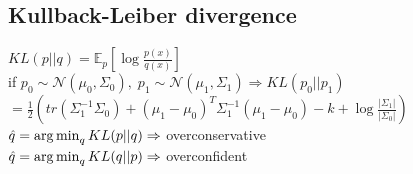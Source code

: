 \subsection{Kullback-Leiber divergence}
$KL(p\vert\vert q)=\mathbb{E}_p\left[\log\frac{p(x)}{q(x)}\right]$\\
if $p_0\sim \mathcal{N}(\mu_0,\Sigma_0),\; p_1\sim \mathcal{N}(\mu_1,\Sigma_1) \Rightarrow KL(p_0\vert\vert p_1)$\\
{\scriptsize$ = \frac{1}{2}\left(tr\left(\Sigma_1^{-1}\Sigma_0\right) + (\mu_1-\mu_0)^T\Sigma_1^{-1}(\mu_1-\mu_0)-k+\log\frac{\vert\Sigma_1\vert}{\vert\Sigma_0\vert}\right)$}\\
$\hat q = \operatorname*{arg\,min}_q KL(p\vert\vert q) \Rightarrow$ overconservative\\
$\hat q = \operatorname*{arg\,min}_q KL(q\vert\vert p) \Rightarrow$ overconfident
